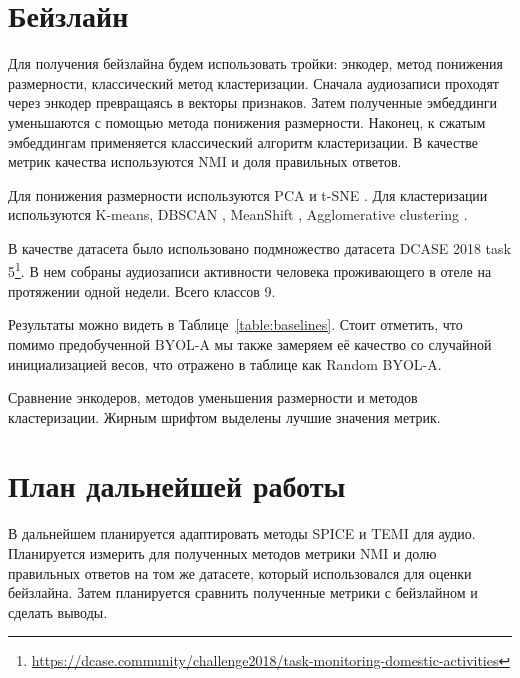 \documentclass[a4paper,12pt]{extarticle}
\begin{document}
\section{Бейзлайн}

Для получения бейзлайна будем использовать тройки: 
энкодер, метод понижения размерности, классический 
метод кластеризации. Сначала аудиозаписи проходят 
через энкодер превращаясь в векторы признаков. 
Затем полученные эмбеддинги уменьшаются с помощью метода
понижения размерности. Наконец, к сжатым эмбеддингам 
применяется классический алгоритм кластеризации. 
В качестве метрик качества используются NMI и доля 
правильных ответов.

Для понижения размерности используются PCA \cite{PCA_overview} и 
t-SNE \cite{JMLR:v9:vandermaaten08a}. Для кластеризации 
используются K-means, DBSCAN \cite{ester1996density}, 
MeanShift \cite{fukunaga1975estimation}, Agglomerative 
clustering \cite{agglomerative}.

В качестве датасета было использовано подмножество 
датасета DCASE 2018 task 5\footnote{\url{https://dcase.community/challenge2018/task-monitoring-domestic-activities}}.
В нем собраны аудиозаписи активности человека проживающего в 
отеле на протяжении одной недели. Всего классов 9. 

Результаты можно видеть в Таблице~\ref{table:baselines}. 
Стоит отметить, что помимо предобученной BYOL-A мы 
также замеряем её качество со случайной инициализацией 
весов, что отражено в таблице как Random BYOL-A.
\begin{table}[]
    \footnotesize
	\centering

	\caption{Сравнение энкодеров, методов уменьшения размерности и методов кластеризации.
	Жирным шрифтом выделены лучшие значения метрик.}
	\label{table:baselines}
\end{table}

\section{План дальнейшей работы}

В дальнейшем планируется адаптировать методы SPICE и TEMI для аудио.
Планируется измерить для 
полученных методов метрики NMI и долю правильных ответов на том же
датасете, который использовался для оценки бейзлайна. Затем планируется 
сравнить полученные метрики с 
бейзлайном и сделать выводы. 
	
\newpage 
\printbibliography[heading=bibintoc] 
	
\end{document}
